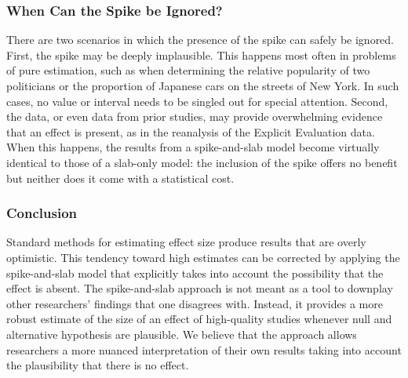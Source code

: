 \documentclass[a4paper]{article}
\newcommand{\EJ}[1]{\todo[inline, color=green]{  #1 }}
\newenvironment{revision}{\color{black}}{\color{black}}
\begin{document}
\begin{revision}
\subsubsection*{When Can the Spike be Ignored?}
\end{revision}
There are two scenarios in which the presence of the spike can safely be ignored.
First, the spike may be deeply implausible.
This happens most often in problems of pure estimation, such as when determining the relative popularity of two politicians or the proportion of Japanese cars on the streets of New York.
In such cases, no value or interval needs to be singled out for special attention.
Second, the data\begin{revision}, or even data from prior studies,\end{revision} may provide overwhelming evidence that an effect is present\begin{revision}, as in the reanalysis of the Explicit Evaluation data.\end{revision}
When this happens, the results from a spike-and-slab model become virtually identical to those of a slab-only model: \begin{revision} the inclusion of the spike offers no benefit but neither does it come with a statistical cost.\end{revision} %

\subsubsection*{Conclusion}
Standard methods for estimating effect size produce results that are overly optimistic.
This \begin{revision}tendency\end{revision} toward high estimates can be corrected by applying the spike-and-slab model \begin{revision}
that explicitly takes into account \end{revision} the possibility that the effect is absent. 
\begin{revision}%
The spike-and-slab approach is not meant as a tool to downplay other researchers' findings that one disagrees with. 
Instead, it provides a more robust estimate of the size of an effect of high-quality studies whenever null and alternative hypothesis are plausible.
We believe that the approach allows researchers a more nuanced interpretation of their own results taking into account the plausibility that there is no effect.
\end{revision}
\end{document}
